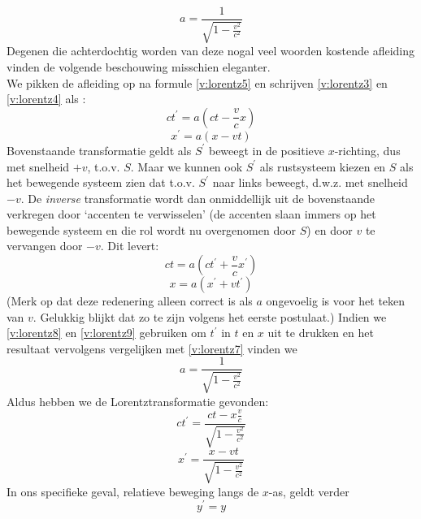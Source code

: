 \begin{displaymath}
a = \frac{1}{\sqrt{1-\frac{v^{2}}{c^{2}}}}
\end{displaymath}
Degenen die achterdochtig worden van deze nogal veel woorden kostende 
afleiding vinden de volgende beschouwing misschien eleganter.\\
We pikken de afleiding op na formule \ref{v:lorentz5} en schrijven 
\ref{v:lorentz3} en \ref{v:lorentz4} als :
\begin{equation}
\label{v:lorentz7}
ct^{'} = a(ct - \frac{v}{c}x)
\end{equation}
\begin{equation}
\label{v:lorentz6}
x^{'} = a(x - vt)
\end{equation}
Bovenstaande transformatie geldt als $S^{'}$ beweegt in de positieve 
$x$-richting, dus met snelheid $+v$, t.o.v. $S$.
Maar we kunnen ook $S^{'}$ als rustsysteem kiezen en $S$ als het bewegende 
systeem zien dat t.o.v. $S^{'}$ naar links beweegt, d.w.z. met snelheid $-v$.
De {\sl inverse} transformatie wordt dan onmiddellijk uit de bovenstaande 
verkregen door `accenten te verwisselen' (de accenten slaan immers op het 
bewegende systeem en die rol wordt nu 
overgenomen door $S$) en door $v$ te vervangen door $-v$. 
Dit levert:
\begin{equation}
ct = a(ct^{'} + \frac{v}{c}x^{'})
\label{v:lorentz9}
\end{equation}
\begin{equation}
\label{v:lorentz8}
x = a(x^{'} + vt^{'})
\end{equation}
(Merk op dat deze redenering alleen correct is als $a$ ongevoelig is voor 
het teken van $v$. 
Gelukkig blijkt dat zo te zijn volgens het eerste postulaat.)
Indien we \ref{v:lorentz8} en \ref{v:lorentz9} gebruiken om $t^{'}$ in $t$ 
en $x$ uit te drukken en het resultaat vervolgens vergelijken met 
\ref{v:lorentz7} vinden we 
\begin{displaymath}
a = \frac{1}{\sqrt{1 - \frac{v^{2}}{c^{2}}}}
\end{displaymath}
Aldus hebben we de Lorentztransformatie gevonden:
\begin{displaymath}
ct^{'} = \frac{ct - x \frac{v}{c}}{\sqrt{1 - \frac{v^{2}}{c^{2}}}}
\end{displaymath}
\begin{displaymath}
x^{'} = \frac{x - vt}{\sqrt{1 - \frac{v^{2}}{c^{2}}}}
\end{displaymath}
In ons specifieke geval, relatieve beweging langs de $x$-as, geldt verder
\begin{displaymath}
y^{'} = y
\end{displaymath}
